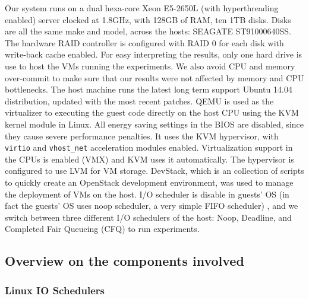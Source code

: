 \documentclass{acmsig}
\begin{document}
Our system runs on a dual hexa-core Xeon E5-2650L (with hyperthreading enabled) server clocked at 1.8GHz, with 128GB of RAM, ten 1TB disks. Disks are all the same make and model, across the hosts: SEAGATE ST91000640SS. The hardware RAID controller is configured with RAID 0 for each disk with write-back cache enabled. For easy interpreting the results, only one hard drive is use to host the VMs running the experiments. We also avoid  CPU and memory over-commit to make sure that our results were not affected by memory and CPU bottlenecks. The host machine runs the latest long term support Ubuntu 14.04 distribution, updated with the most recent patches. QEMU is used as the virtualizer to executing the guest code directly on the host CPU using the KVM kernel module in Linux. All energy saving settings in the BIOS are disabled, since they cause severe performance penalties. It uses the KVM hypervisor, with \texttt{virtio} and \texttt{vhost\_net} acceleration modules enabled. Virtualization support in the CPUs is enabled (VMX) and KVM uses it automatically. The hypervisor is configured to use LVM for VM storage. DevStack, which is an collection of scripts to quickly create an OpenStack development environment, was used to manage the deployment of VMs on the host. I/O scheduler is disable in guests' OS (in fact the guests' OS uses noop scheduler, a very simple FIFO scheduler) , and we switch between three different I/O schedulers of the host: Noop, Deadline, and Completed Fair Queueing (CFQ) to run experiments.
\subsection{Overview on the components involved}
  \subsubsection{Linux IO Schedulers}
\end{document}
